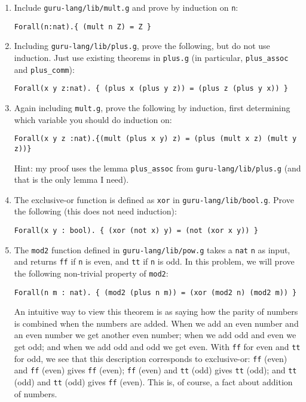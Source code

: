 \documentclass{book}[12pt]
\begin{document}
\begin{enumerate}

\item Include \texttt{guru-lang/lib/mult.g} and prove by induction on
\texttt{n}:

\begin{verbatim}
Forall(n:nat).{ (mult n Z) = Z }
\end{verbatim}

\item Including \texttt{guru-lang/lib/plus.g}, prove the following,
but do not use induction.  Just use existing theorems in \texttt{plus.g}
(in particular, \texttt{plus\_assoc} and \texttt{plus\_comm}):

\begin{verbatim}
Forall(x y z:nat). { (plus x (plus y z)) = (plus z (plus y x)) }
\end{verbatim}

\item Again including \texttt{mult.g}, prove the following by induction, first
determining which variable you should do induction on:

\begin{verbatim}
Forall(x y z :nat).{(mult (plus x y) z) = (plus (mult x z) (mult y z))}
\end{verbatim}

Hint: my proof uses the lemma \texttt{plus\_assoc} from \texttt{guru-lang/lib/plus.g}
(and that is the only lemma I need).

\item The exclusive-or function is defined as \texttt{xor} in \texttt{guru-lang/lib/bool.g}.
Prove the following (this does not need induction):

\begin{verbatim}
Forall(x y : bool). { (xor (not x) y) = (not (xor x y)) } 
\end{verbatim}

\item The \texttt{mod2} function defined in
\texttt{guru-lang/lib/pow.g} takes a \texttt{nat} \texttt{n} as input,
and returns \texttt{ff} if \texttt{n} is even, and \texttt{tt} if
\texttt{n} is odd.  In this problem, we will prove the following non-trivial
property of \texttt{mod2}:

\begin{verbatim}
Forall(n m : nat). { (mod2 (plus n m)) = (xor (mod2 n) (mod2 m)) }
\end{verbatim}

\noindent An intuitive way to view this theorem is as saying how the
parity of numbers is combined when the numbers are added.  When we add
an even number and an even number we get another even number; when we
add odd and even we get odd; and when we add odd and odd we get even.
With \texttt{ff} for even and \texttt{tt} for odd, we see that this
description corresponds to exclusive-or: \texttt{ff} (even) and
\texttt{ff} (even) gives \texttt{ff} (even); \texttt{ff} (even) and
\texttt{tt} (odd) gives \texttt{tt} (odd); and \texttt{tt} (odd) and
\texttt{tt} (odd) gives \texttt{ff} (even).  This is, of course, a fact
about addition of numbers.


\end{enumerate}
\end{document}
